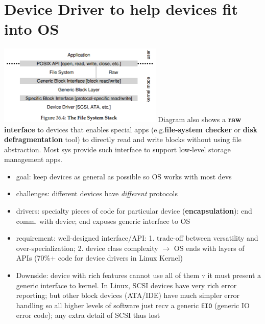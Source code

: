 \section*{Device Driver to help devices fit into OS}
\begin{minipage}{\linewidth}
\includegraphics[width=\linewidth,height=3.8cm]{imgs/filesys_stack}
\flushleft
Diagram also shows a \textbf{raw interface} to devices that enables special apps (e.g.\textbf{file-system checker} or \textbf{disk defragmentation} tool) to directly read and write blocks without using file abstraction. Most sys provide such interface to support low-level storage management apps.
\end{minipage}
\begin{itemize}
\item goal: keep devices as general as possible so OS works with most devs
\item challenges: different devices have \emph{different} protocols
\item drivers: specialty pieces of code for particular device (\textbf{encapsulation}):  end comm. with device;  end exposes generic interface to OS
\item requirement: well-designed interface/API: 1. trade-off between versatility and over-specialization; 2. device class complexity $\to$ OS ends with layers of APIs (70\%+ code for device drivers in Linux Kernel)
\item Downside: device with rich features cannot use all of them $\because$ it must present a generic interface to kernel. In Linux, SCSI devices have very rich error reporting; but other block devices (ATA/IDE) have much simpler error handling so all higher levels of software just recv a generic \texttt{EIO} (generic IO error code); any extra detail of SCSI thus lost
\end{itemize}
